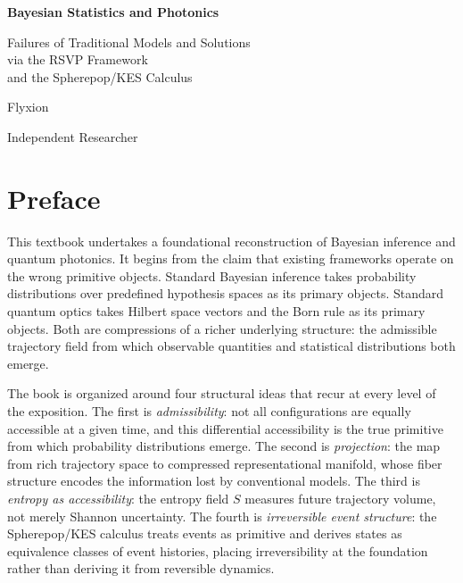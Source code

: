 \documentclass[11pt, openright, twoside]{book}
\theoremstyle{plain}
\theoremstyle{definition}
\theoremstyle{remark}
\newcommand{\Sfield}{S}
\begin{document}
\frontmatter

\begin{titlepage}
\centering
\vspace*{2cm}
{\Huge\bfseries Bayesian Statistics and Photonics\par}
\vspace{0.6cm}
{\Large Failures of Traditional Models and Solutions\\[4pt]
via the RSVP Framework\\[4pt]
and the Spherepop/KES Calculus\par}
\vspace{2cm}
{\large Flyxion\par}
{\normalsize Independent Researcher\par}
\vfill
\end{titlepage}
\clearpage{\pagestyle{empty}\cleardoublepage}

\chapter*{Preface}

This textbook undertakes a foundational reconstruction of Bayesian inference and quantum
photonics. It begins from the claim that existing frameworks operate on the wrong primitive
objects. Standard Bayesian inference takes probability distributions over predefined
hypothesis spaces as its primary objects. Standard quantum optics takes Hilbert space
vectors and the Born rule as its primary objects. Both are compressions of a richer
underlying structure: the admissible trajectory field from which observable quantities
and statistical distributions both emerge.

The book is organized around four structural ideas that recur at every level of the
exposition. The first is \emph{admissibility}: not all configurations are equally
accessible at a given time, and this differential accessibility is the true primitive from
which probability distributions emerge. The second is \emph{projection}: the map from rich
trajectory space to compressed representational manifold, whose fiber structure encodes the
information lost by conventional models. The third is \emph{entropy as accessibility}: the
entropy field $\Sfield$ measures future trajectory volume, not merely Shannon uncertainty.
The fourth is \emph{irreversible event structure}: the Spherepop/KES calculus treats events
as primitive and derives states as equivalence classes of event histories, placing
irreversibility at the foundation rather than deriving it from reversible dynamics.
\end{document}
